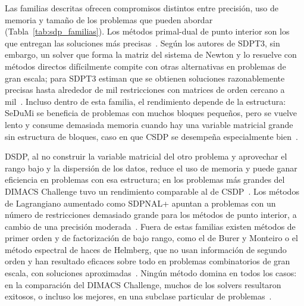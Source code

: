 Las familias descritas ofrecen compromisos distintos entre precisión, uso de memoria y tamaño de
los problemas que pueden abordar (Tabla~\ref{tab:sdp_familias}). Los métodos primal-dual de punto
interior son los que entregan las soluciones más
precisas~\parencite[p.~419]{mittelmannIndependentBenchmarkingSDP2003a}. Según los autores de
SDPT3, sin embargo, un solver que forma la matriz del sistema de Newton y lo resuelve con métodos
directos difícilmente compite con otras alternativas en problemas de gran escala; para SDPT3
estiman que se obtienen soluciones razonablemente precisas hasta alrededor de mil restricciones
con matrices de orden cercano a mil~\parencite[p.~414]{mittelmannIndependentBenchmarkingSDP2003a}.
Incluso dentro de esta familia, el rendimiento depende de la estructura: SeDuMi se beneficia de
problemas con muchos bloques pequeños, pero se vuelve lento y consume demasiada memoria cuando
hay una variable matricial grande sin estructura de bloques, caso en que CSDP se desempeña
especialmente bien~\parencite[pp.~412 y 421]{mittelmannIndependentBenchmarkingSDP2003a}.

DSDP, al no construir la variable matricial del otro problema y aprovechar el rango bajo y la
dispersión de los datos, reduce el uso de memoria y puede ganar eficiencia en problemas con esa
estructura; en los problemas más grandes del DIMACS Challenge tuvo un rendimiento comparable al de
CSDP~\parencite[pp.~413 y 421]{mittelmannIndependentBenchmarkingSDP2003a}. Los métodos de
Lagrangiano aumentado como SDPNAL+ apuntan a problemas con un número de restricciones demasiado
grande para los métodos de punto interior, a cambio de una precisión
moderada~\parencite[pp.~1738--1739]{zhaoNewtonCGAugmentedLagrangian2010a}. Fuera de estas familias
existen métodos de primer orden y de factorización de bajo rango, como el de Burer y Monteiro o el
método espectral de haces de Helmberg, que no usan información de segundo orden y han resultado
eficaces sobre todo en problemas combinatorios de gran escala, con soluciones
aproximadas~\parencite[pp.~410 y 416--420]{mittelmannIndependentBenchmarkingSDP2003a}.
Ningún método domina en todos los casos: en la comparación del DIMACS Challenge, muchos de los
solvers resultaron exitosos, o incluso los mejores, en una subclase particular de
problemas~\parencite[p.~422]{mittelmannIndependentBenchmarkingSDP2003a}.

